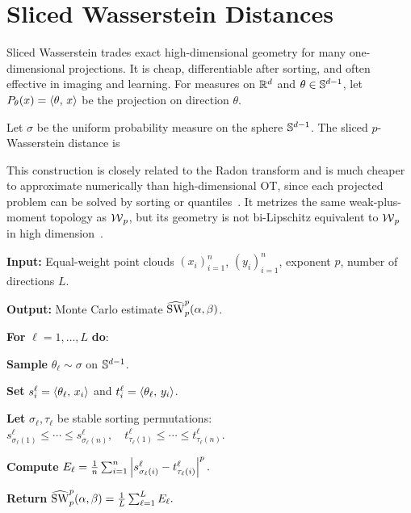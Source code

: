 \section{Sliced Wasserstein Distances}
\label{sec-sliced-wasserstein}

Sliced Wasserstein trades exact high-dimensional geometry for many one-dimensional projections. It is cheap, differentiable after sorting, and often effective in imaging and learning. For measures on $\mathbb{R}^d$ and $\theta\in\mathbb{S}^{d-1}$, let $P_\theta(x)=\langle \theta,\,x\rangle$ be the projection on direction $\theta$.

\begin{defn}\label{def-sliced-wasserstein}
	Let $\sigma$ be the uniform probability measure on the sphere $\mathbb{S}^{d-1}$. The sliced $p$-Wasserstein distance is
\end{defn}
This construction is closely related to the Radon transform and is much cheaper to approximate numerically than high-dimensional OT, since each projected problem can be solved by sorting or quantiles~\cite{rabin-ssvm-11,2013-Bonneel-barycenter,kolouri2016sliced}. It metrizes the same weak-plus-moment topology as $\operatorname{\mathcal{W}}_p$, but its geometry is not bi-Lipschitz equivalent to $\operatorname{\mathcal{W}}_p$ in high dimension~\cite{nadjahi2019asymptotic}.

\begin{alg}\label{alg:monte-carlo-sliced-wasserstein}
\textbf{Input:} Equal-weight point clouds $(x_i)_{i=1}^n$, $(y_i)_{i=1}^n$, exponent $p$, number of directions $L$.

\textbf{Output:} Monte Carlo estimate $\widehat{\operatorname{SW}}_p^p(\alpha,\beta)$.

\textbf{For} $\ell=1,\ldots,L$ \textbf{do}:
\begin{algblock}

\textbf{Sample} $\theta_\ell\sim\sigma$ on $\mathbb{S}^{d-1}$.

\textbf{Set} $s_i^\ell=\langle \theta_\ell,\,x_i\rangle$ and $t_i^\ell=\langle \theta_\ell,\,y_i\rangle$.

\textbf{Let} $\sigma_\ell,\tau_\ell$ be stable sorting permutations:
\(s_{\sigma_\ell(1)}^\ell\leq\cdots\leq s_{\sigma_\ell(n)}^\ell, \quad t_{\tau_\ell(1)}^\ell\leq\cdots\leq t_{\tau_\ell(n)}^\ell.\)

\textbf{Compute}
\(E_\ell=\frac1n\sum_{i=1}^n\left\lvert s_{\sigma_\ell(i)}^\ell-t_{\tau_\ell(i)}^\ell\right\rvert^p.\)
\end{algblock}
\algreturnskip
\textbf{Return} \(\widehat{\operatorname{SW}}_p^p(\alpha,\beta)=\frac1L\sum_{\ell=1}^L E_\ell.\)
\end{alg}

